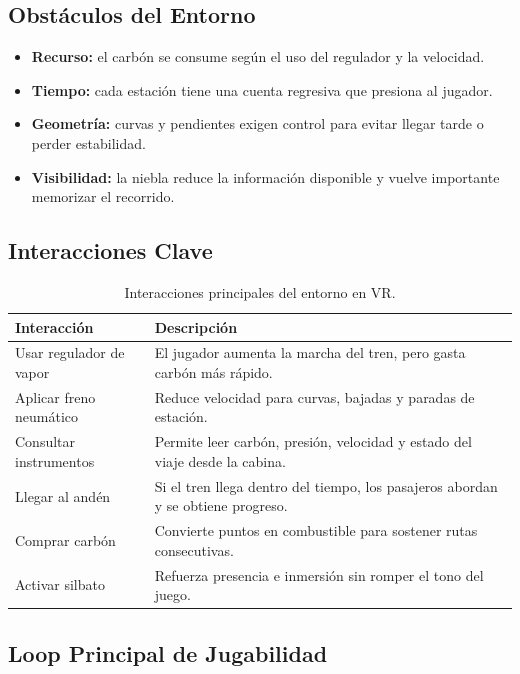 \documentclass[11pt,letterpaper]{article}
\begin{document}
\subsection{Obstáculos del Entorno}

\begin{itemize}
  \item \textbf{Recurso:} el carbón se consume según el uso del regulador y la velocidad.
  \item \textbf{Tiempo:} cada estación tiene una cuenta regresiva que presiona al jugador.
  \item \textbf{Geometría:} curvas y pendientes exigen control para evitar llegar tarde o perder estabilidad.
  \item \textbf{Visibilidad:} la niebla reduce la información disponible y vuelve importante memorizar el recorrido.
\end{itemize}

\subsection{Interacciones Clave}

\begin{table}[H]
\centering
\begin{tabularx}{\textwidth}{@{}L{4.2cm}Y@{}}
\toprule
\textbf{Interacción} & \textbf{Descripción}\\
\midrule
Usar regulador de vapor & El jugador aumenta la marcha del tren, pero gasta carbón más rápido.\\
Aplicar freno neumático & Reduce velocidad para curvas, bajadas y paradas de estación.\\
Consultar instrumentos & Permite leer carbón, presión, velocidad y estado del viaje desde la cabina.\\
Llegar al andén & Si el tren llega dentro del tiempo, los pasajeros abordan y se obtiene progreso.\\
Comprar carbón & Convierte puntos en combustible para sostener rutas consecutivas.\\
Activar silbato & Refuerza presencia e inmersión sin romper el tono del juego.\\
\bottomrule
\end{tabularx}
\caption{Interacciones principales del entorno en VR.}
\end{table}

\subsection{Loop Principal de Jugabilidad}
\end{document}
